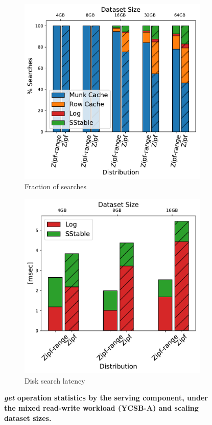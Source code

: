\begin{figure}[t]
\centering
\begin{subfigure}{0.49\linewidth}
\includegraphics[width=\textwidth]{figs/Time_percentage_A.pdf}
\caption{Fraction of searches}
\label{fig:readstat:dist}
\end{subfigure}
\begin{subfigure}{0.49\linewidth}
\includegraphics[width=\textwidth]{figs/Latency_A.pdf}
\caption{Disk search latency}
\label{fig:readstat:lat}
\end{subfigure}
\caption{\bf{\sys\/ {\em get\/} operation statistics by the serving component, under the mixed read-write workload (YCSB-A) and scaling dataset sizes.}}
\label{fig:readstat}
\end{figure}

